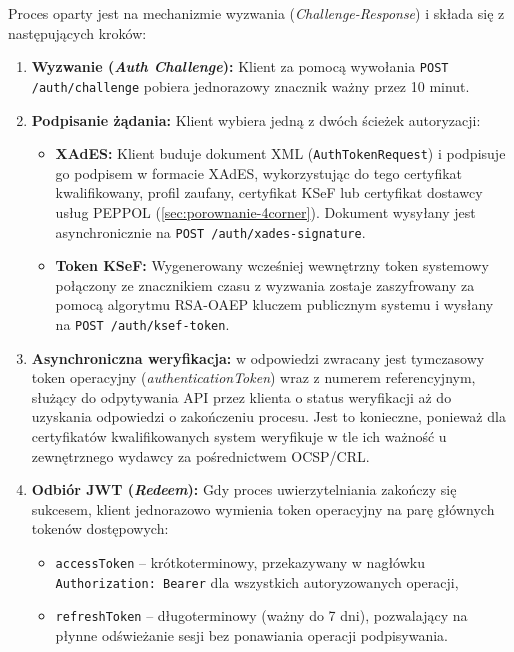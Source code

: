 Proces oparty jest na mechanizmie wyzwania (\textit{Challenge-Response}) i składa się z następujących kroków: \cite{ksef-docs-repo}

\begin{enumerate}
    \item \textbf{Wyzwanie (\textit{Auth Challenge}):} Klient za pomocą wywołania \texttt{POST /auth/challenge} pobiera jednorazowy znacznik ważny przez 10 minut.
    
    \item \textbf{Podpisanie żądania:} Klient wybiera jedną z dwóch ścieżek autoryzacji:
    \begin{itemize}
        \item \textbf{XAdES:} Klient buduje dokument XML (\texttt{AuthTokenRequest}) i podpisuje go podpisem w formacie XAdES, wykorzystując do tego certyfikat kwalifikowany, profil zaufany, certyfikat KSeF lub certyfikat dostawcy usług PEPPOL (\ref{sec:porownanie-4corner}). Dokument wysyłany jest asynchronicznie na \texttt{POST /auth/xades-signature}.
        \item \textbf{Token KSeF:} Wygenerowany wcześniej wewnętrzny token systemowy połączony ze znacznikiem czasu z wyzwania zostaje zaszyfrowany za pomocą algorytmu RSA-OAEP kluczem publicznym systemu i wysłany na \texttt{POST /auth/ksef-token}.
    \end{itemize}
    
    \item \textbf{Asynchroniczna weryfikacja:} w odpowiedzi zwracany jest tymczasowy token operacyjny (\textit{authenticationToken}) wraz z numerem referencyjnym, służący do odpytywania API przez klienta o status weryfikacji aż do uzyskania odpowiedzi o zakończeniu procesu. Jest to konieczne, ponieważ dla certyfikatów kwalifikowanych system weryfikuje w tle ich ważność u zewnętrznego wydawcy za pośrednictwem OCSP/CRL.
    
    \item \textbf{Odbiór JWT (\textit{Redeem}):} Gdy proces uwierzytelniania zakończy się sukcesem, klient jednorazowo wymienia token operacyjny na parę głównych tokenów dostępowych:
    \begin{itemize}
        \item \texttt{accessToken} -- krótkoterminowy, przekazywany w nagłówku \texttt{Authorization: Bearer} dla wszystkich autoryzowanych operacji,
        \item \texttt{refreshToken} -- długoterminowy (ważny do 7 dni), pozwalający na płynne odświeżanie sesji bez ponawiania operacji podpisywania.
    \end{itemize}
\end{enumerate}

